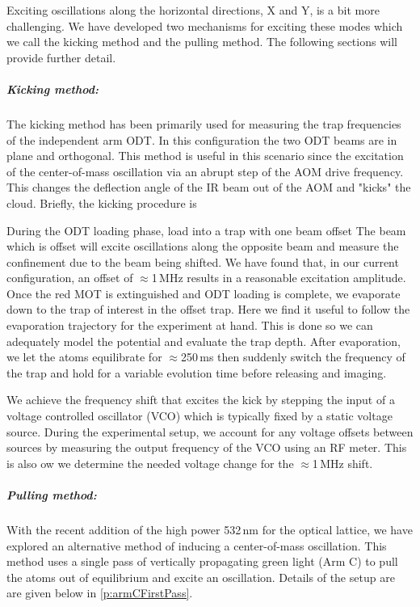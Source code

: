 Exciting oscillations along the horizontal directions, X and Y, is a bit more challenging.
We have developed two mechanisms for exciting these modes which we call the kicking method and the pulling method.
The following sections will provide further detail.

\subparagraph{Kicking method:}
The kicking method has been primarily used for measuring the trap frequencies of the independent arm ODT.
In this configuration the two ODT beams are in plane and orthogonal.
This method is useful in this scenario since the excitation of the center-of-mass oscillation via an abrupt step of the AOM drive frequency.
This changes the deflection angle of the IR beam out of the AOM and "kicks" the cloud.
Briefly, the kicking procedure is 
\begin{outline}[enumerate]
	\1 During the ODT loading phase, load into a trap with one beam offset
		\2 The beam which is offset will excite oscillations along the opposite beam and measure the confinement due to the beam being shifted.
		\2 We have found that, in our current configuration, an offset of $\approx$1\,MHz results in a reasonable excitation amplitude.
	\1 Once the red MOT is extinguished and ODT loading is complete, we evaporate down to the trap of interest in the offset trap.
		\2 Here we find it useful to follow the evaporation trajectory for the experiment at hand. This is done so we can adequately model the potential and evaluate the trap depth.
	\1 After evaporation, we let the atoms equilibrate for $\approx$250\,ms then suddenly switch the frequency of the trap and hold for a variable evolution time before releasing and imaging.
\end{outline}

We achieve the frequency shift that excites the kick by stepping the input of a voltage controlled oscillator (VCO) which is typically fixed by a static voltage source.
During the experimental setup, we account for any voltage offsets between sources by measuring the output frequency of the VCO using an RF meter.
This is also ow we determine the needed voltage change for the $\approx$1\,MHz shift.

\subparagraph{Pulling method:}
With the recent addition of the high power 532\,nm for the optical lattice, we have explored an alternative method of inducing a center-of-mass oscillation. 
This method uses a single pass of vertically propagating green light (Arm C) to pull the atoms out of equilibrium and excite an oscillation.
Details of the setup are are given below in \ref{p:armCFirstPass}.

